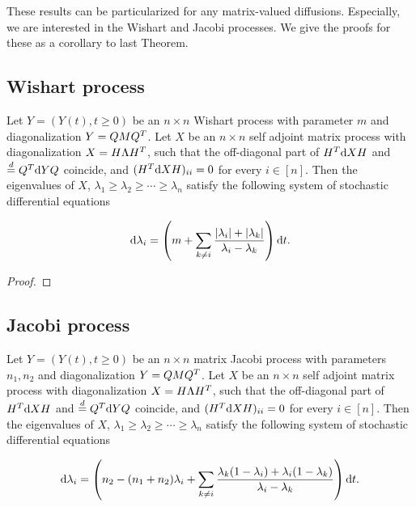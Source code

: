 These results can be particularized for any matrix-valued diffusions. Especially, we are interested in the Wishart and Jacobi processes. We give the proofs for these as a corollary to last Theorem.

\subsection{Wishart process}

\begin{corollary}
    Let $Y = (Y(t), t \ge 0)$ be an $n\times n$ Wishart process with parameter $m$ and diagonalization $Y = QMQ^T$. Let $X$ be an $n\times n$ self adjoint matrix process with diagonalization $X = H \Lambda H^T$, such that the off-diagonal part of $H^T \mathrm d X H $ and $\overset{d}{=} Q^T \mathrm d Y Q$ coincide, and $(H^T \mathrm d X H)_{ii} = 0$ for every $i \in [n]$. Then the eigenvalues of $X$, $\lambda_1 \ge \lambda_2 \ge \cdots \ge \lambda_n$ satisfy the following system of stochastic differential equations

    \begin{equation*}
        \mathrm d \lambda_i = \left( m +\sum_{k\neq i} \frac{ \lvert \lambda_i \rvert + \lvert \lambda_k \rvert }{\lambda_i - \lambda_k}\right)\mathrm d t.
    \end{equation*}
\end{corollary}

\begin{proof}
    
\end{proof}


\subsection{Jacobi process}

\begin{corollary}
    Let $Y = (Y(t), t \ge 0)$ be an $n\times n$ matrix Jacobi process with parameters $n_1,n_2$ and diagonalization $Y = QMQ^T$. Let $X$ be an $n\times n$ self adjoint matrix process with diagonalization $X = H \Lambda H^T$, such that the off-diagonal part of $H^T \mathrm d X H $ and $\overset{d}{=} Q^T \mathrm d Y Q$ coincide, and $(H^T \mathrm d X H)_{ii} = 0$ for every $i \in [n]$. Then the eigenvalues of $X$, $\lambda_1 \ge \lambda_2 \ge \cdots \ge \lambda_n$ satisfy the following system of stochastic differential equations

    \begin{equation*}
        \mathrm d \lambda_i = \left( n_2 - (n_1 + n_2)\lambda_i + \sum_{k\neq i} \frac{\lambda_k(1-\lambda_i) + \lambda_i(1-\lambda_k)}{\lambda_i - \lambda_k} \right)\mathrm d t.
    \end{equation*}

\end{corollary}
